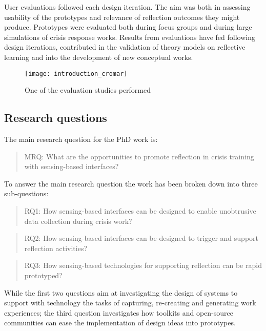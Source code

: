 User evaluations followed each design iteration. The aim was both in
assessing usability of the prototypes and relevance of reflection
outcomes they might produce. Prototypes were evaluated both during focus
groups and during large simulations of crisis response works. Results
from evaluations have fed following design iterations, contributed in
the validation of theory models on reflective learning and into the
development of new conceptual works.

\begin{figure}[tbh]
    \centering
    \texttt{[image: introduction\_cromar]}
    \caption{One of the evaluation studies performed}
    \label{fig:cromar}
\end{figure}

\subsection{Research questions}\label{research-questions}

The main research question for the PhD work is:

\begin{quote}
MRQ: What are the opportunities to promote reflection in crisis training
with sensing-based interfaces?
\end{quote}

To answer the main research question the work has been broken down into
three sub-questions:

\begin{quote}
RQ1: How sensing-based interfaces can be designed to enable unobtrusive
data collection during crisis work?
\end{quote}

\begin{quote}
RQ2: How sensing-based interfaces can be designed to trigger and support
reflection activities?
\end{quote}

\begin{quote}
RQ3: How sensing-based technologies for supporting reflection can be
rapid prototyped?
\end{quote}

While the first two questions aim at investigating the design of systems
to support with technology the tasks of capturing, re-creating and
generating work experiences; the third question investigates how
toolkits and open-source communities can ease the implementation of
design ideas into prototypes.

